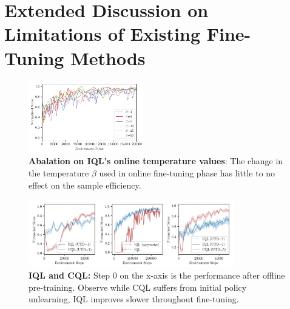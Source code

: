 \section{Extended Discussion on Limitations of Existing Fine-Tuning Methods}
\label{appendix:more_discussion_on_finetuning}

\begin{figure}[h]
\begin{center}
\centerline{\includegraphics[width=0.45\textwidth]{figs-sample/iql-beta.pdf}}

\caption{\label{fig:beta_ablation}\footnotesize{\textbf{Abalation on IQL's online temperature values}: The change in the temperature $\beta$ used in online fine-tuning phase has little to no effect on the sample efficiency.}}
\end{center}
\vspace{-0.8cm}

\end{figure}

\begin{figure}[h]

\begin{center}
\centerline{\includegraphics[width=0.8\textwidth]{figs-sample/iql-analysis-final.png}}

\caption{\label{fig:cql_iql_finetune_app}\footnotesize{\textbf{IQL and CQL:} Step 0 on the x-axis is the performance after offline pre-training. Observe while CQL suffers from initial policy unlearning, IQL improves slower throughout fine-tuning.}}

\end{center}
\vspace{-0.9cm}

\end{figure}



